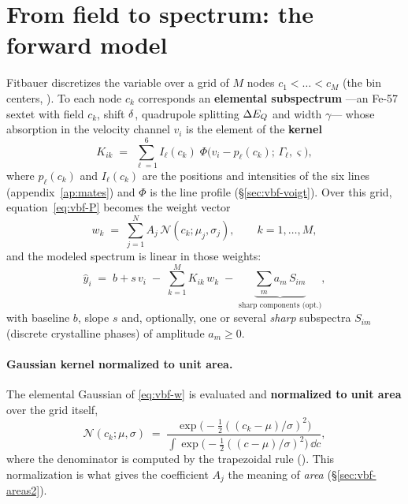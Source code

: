 \section{From field to spectrum: the forward model}
\label{sec:vbf-directo}

Fitbauer discretizes the variable over a grid of $M$ nodes
$c_1<\dots<c_M$ (the bin centers, ). To each node $c_k$
corresponds an \textbf{elemental subspectrum} —an Fe-57 sextet with field
$c_k$, shift $\delta$, quadrupole splitting $\Delta E_{Q}$ and width $\gamma$—
whose absorption in the velocity channel $v_i$ is the element of the
\textbf{kernel}
\begin{equation}
  K_{ik} \;=\; \sum_{\ell=1}^{6} I_\ell(c_k)\;
  \Phi\!\bigl(v_i - p_\ell(c_k);\,\Gamma_\ell,\varsigma\bigr),
  \label{eq:vbf-kernel}
\end{equation}
where $p_\ell(c_k)$ and $I_\ell(c_k)$ are the positions and intensities of the six
lines (appendix~\ref{ap:mates}) and $\Phi$ is the line profile
(\S\ref{sec:vbf-voigt}). Over this grid, equation~\eqref{eq:vbf-P} becomes the
weight vector
\begin{equation}
  w_k \;=\; \sum_{j=1}^{N} A_j\, \mathcal N(c_k;\mu_j,\sigma_j),
  \qquad k=1,\dots,M,
  \label{eq:vbf-w}
\end{equation}
and the modeled spectrum is linear in those weights:
\begin{equation}
  \hat y_i \;=\; b + s\,v_i \;-\; \sum_{k=1}^{M} K_{ik}\,w_k
  \;-\; \underbrace{\sum_{m} a_m\,S_{im}}_{\text{sharp components (opt.)}},
  \label{eq:vbf-model}
\end{equation}
with baseline $b$, slope $s$ and, optionally, one or several \emph{sharp}
subspectra $S_{im}$ (discrete crystalline phases) of amplitude $a_m\ge0$.

\paragraph{Gaussian kernel normalized to unit area.} The elemental Gaussian of
\eqref{eq:vbf-w} is evaluated and \textbf{normalized to unit area} over the grid
itself,
\begin{equation}
  \mathcal N(c_k;\mu,\sigma) \;=\;
  \frac{\exp\!\bigl(-\tfrac12((c_k-\mu)/\sigma)^2\bigr)}
       {\displaystyle\int \exp\!\bigl(-\tfrac12((c-\mu)/\sigma)^2\bigr)\,\dd c},
  \label{eq:vbf-gauss}
\end{equation}
where the denominator is computed by the trapezoidal rule ().
This normalization is what gives the coefficient $A_j$ the meaning of \emph{area}
(\S\ref{sec:vbf-areas2}).

